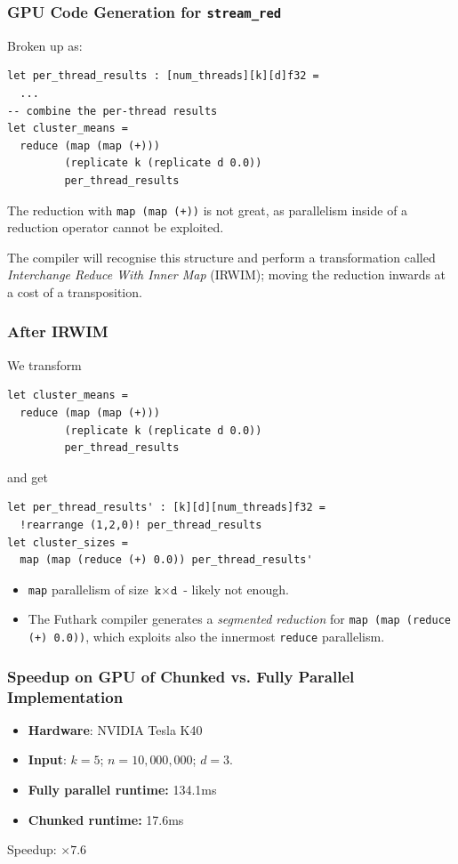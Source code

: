 \documentclass[rgb,dvipsnames]{beamer}
\begin{document}
\begin{frame}[fragile]
  \frametitle{GPU Code Generation for \texttt{stream\_red}}

  Broken up as:

  \begin{lstlisting}
let per_thread_results : [num_threads][k][d]f32 =
  ...
-- combine the per-thread results
let cluster_means =
  reduce (map (map (+)))
         (replicate k (replicate d 0.0))
         per_thread_results
\end{lstlisting}

  The reduction with \lstinline{map (map (+))} is not great, as
  parallelism inside of a reduction operator cannot be exploited.

  The compiler will recognise this structure and perform a
  transformation called \textit{Interchange Reduce With Inner Map}
  (IRWIM); moving the reduction inwards at a cost of a transposition.
\end{frame}

\begin{frame}[fragile]
  \frametitle{After IRWIM}

  We transform
  \begin{lstlisting}
let cluster_means =
  reduce (map (map (+)))
         (replicate k (replicate d 0.0))
         per_thread_results
\end{lstlisting}

and get

\begin{lstlisting}
let per_thread_results' : [k][d][num_threads]f32 =
  !rearrange (1,2,0)! per_thread_results
let cluster_sizes =
  map (map (reduce (+) 0.0)) per_thread_results'
\end{lstlisting}

\begin{itemize}
\item \lstinline{map} parallelism of size $\texttt{k}\times\texttt{d}$ -
  likely not enough.
\item The Futhark compiler generates a \textit{segmented reduction}
  for
  \lstinline{map (map (reduce (+) 0.0))}, which exploits also the
  innermost \lstinline{reduce} parallelism.
\end{itemize}
\end{frame}

\begin{frame}
  \frametitle{Speedup on GPU of Chunked vs. Fully Parallel Implementation}

  \begin{itemize}
  \item \textbf{Hardware}: \hfill NVIDIA Tesla K40
  \item \textbf{Input}: \hfill $k=5$; $n=10,000,000$; $d=3$.
  \item \textbf{Fully parallel runtime:} \hfill 134.1ms
  \item \textbf{Chunked runtime:} \hfill 17.6ms
  \end{itemize}

  \vspace{2cm}
  \centering\large Speedup: $\times7.6$
\end{frame}
\end{document}
